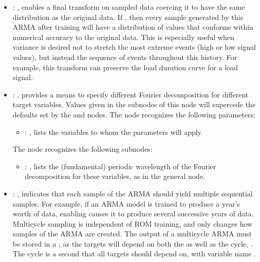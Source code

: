 \begin{itemize}
    \item {}: , 
      enables a final transform on sampled                                                    data
      coercing it to have the same distribution as the original data. If , then
      every                                                    sample generated by this ARMA after
      training will have a distribution of values that conforms within
      numerical accuracy to the original data. This is especially useful when variance is desired
      not to stretch                                                    the most extreme events
      (high or low signal values), but instead the sequence of events throughout this
      history. For example, this transform can preserve the load duration curve for a load signal.

    \item {}: , 
      provides a means to specify different Fourier
      decomposition for different target variables.  Values given in the subnodes of this node will
      supercede                                                    the defaults set by the
       and  nodes.
      The  node recognizes the following parameters:
        \begin{itemize}
          \item {}: , 
            lists the variables to whom                     the  parameters
            will apply.
      \end{itemize}

      The  node recognizes the following subnodes:
      \begin{itemize}
        \item {}: , 
          lists the (fundamental)                                                    periodic
          wavelength of the Fourier decomposition for these variables,
          as in the  general node.
      \end{itemize}

    \item {}: , 
      indicates that each sample of the ARMA should yield
      multiple sequential samples. For example, if an ARMA model is trained to produce a year's
      worth of data,                                                    enabling
       causes it to produce several successive years of data. Multicycle
      sampling                                                    is independent of ROM training,
      and only changes how samples of the ARMA are created.
      \nb The output of a multicycle ARMA must be stored in a , as the targets will
      depend                                                    on both the 
      as well as the cycle, . The cycle is a second
       that all targets should depend on, with variable name .


\end{itemize}
